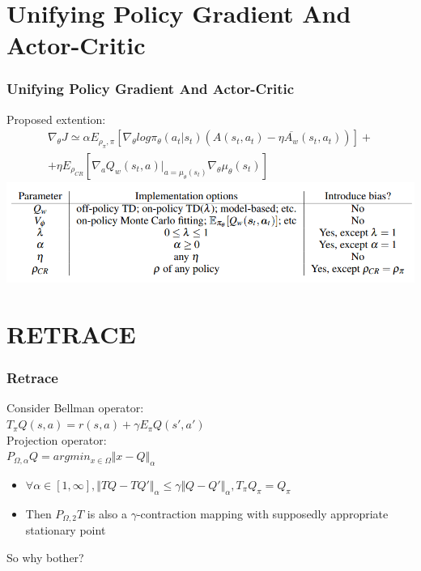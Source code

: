 \documentclass{beamer}
\begin{document}
\section{Unifying Policy Gradient And Actor-Critic}

\begin{frame}[t]
\frametitle{Unifying Policy Gradient And Actor-Critic}

Proposed extention:
\begin{multline*}
\nabla_{\theta} J \simeq \alpha E_{\rho_\pi, \pi} \left[ \nabla_{\theta} log \pi_\theta ( a_t | s_t) (A(s_t, a_t) - \eta \overline{A_w} (s_t,a_t)) \right] + \\ + \eta E_{\rho_{CR}} \left[ \nabla_a Q_w(s_t, a) |_{a=\mu_\theta(s_t)} 
\nabla_\theta \mu_\theta(s_t)
\right]
\end{multline*}
\includegraphics[scale=0.37]{extention}

\end{frame}

\section{RETRACE}


\begin{frame}
\frametitle{Retrace}
Consider Bellman operator:\\
$T_\pi Q (s,a) = r(s,a) + \gamma E_\pi Q(s',a')$\\

\vspace{3mm}
Projection operator:\\
$P_{\Omega, \alpha} Q = argmin_{x \in \Omega} \Vert x - Q \Vert_\alpha$\\

\vspace{3mm}

\begin{itemize}
\item $ \forall \alpha \in [1,\infty], \Vert TQ - TQ' \Vert_\alpha \leq \gamma \Vert Q - Q' \Vert_\alpha, T_\pi Q_\pi = Q_\pi$
\item Then $P_{\Omega, 2} T$ is also a $\gamma$-contraction mapping with supposedly appropriate stationary point
\end{itemize}

\vspace{3mm}
So why bother?

\end{frame}
\end{document}
